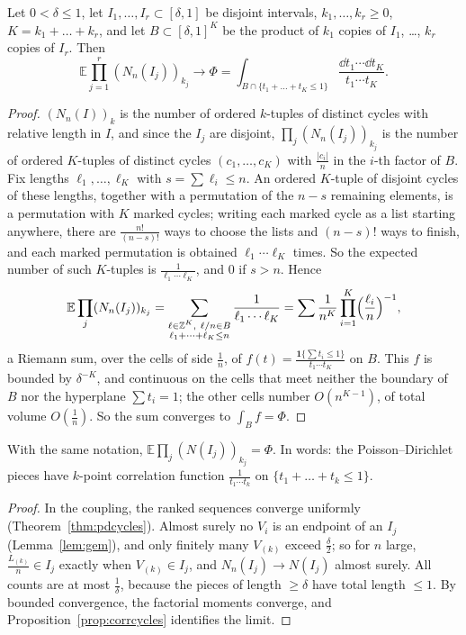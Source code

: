 \begin{proposition}\label{prop:corrcycles}
Let $0<\delta\le1$, let $I_1,\dots,I_r\subset[\delta,1]$ be disjoint intervals, $k_1,\dots,k_r\ge0$, $K=k_1+\dots+k_r$, and let $B\subset[\delta,1]^K$ be the product of $k_1$ copies of $I_1$, \ldots, $k_r$ copies of $I_r$. Then
\[
\mathbb E\prod_{j=1}^r(N_n(I_j))_{k_j}\longrightarrow\Phi=\int_{B\cap\{t_1+\dots+t_K\le1\}}\frac{\dd t_1\cdots\dd t_K}{t_1\cdots t_K}.
\]
\end{proposition}
\begin{proof}
$(N_n(I))_k$ is the number of ordered $k$-tuples of distinct cycles with relative length in $I$, and since the $I_j$ are disjoint, $\prod_j(N_n(I_j))_{k_j}$ is the number of ordered $K$-tuples of distinct cycles $(c_1,\dots,c_K)$ with $\frac{|c_i|}n$ in the
$i$-th factor of $B$. Fix lengths $\ell_1,\dots,\ell_K$ with $s=\sum\ell_i\le n$. An ordered $K$-tuple of disjoint cycles of these lengths, together with a permutation of the $n-s$ remaining elements, is a permutation with $K$ marked cycles; writing each marked cycle as a list starting anywhere,
there are $\frac{n!}{(n-s)!}$ ways to choose the lists and $(n-s)!$ ways to finish, and each marked permutation is obtained $\ell_1\cdots\ell_K$ times. So the expected number of such $K$-tuples is $\frac1{\ell_1\cdots\ell_K}$, and $0$ if $s>n$. Hence
\[
\mathbb E\prod_j(N_n(I_j))_{k_j}=\sum_{\substack{\ell\in\mathbb Z^K,\ \ell/n\in B\\ \ell_1+\dots+\ell_K\le n}}\frac1{\ell_1\cdots\ell_K}=\sum\frac1{n^K}\prod_{i=1}^K\Bigl(\frac{\ell_i}n\Bigr)^{-1},
\]
a Riemann sum, over the cells of side $\frac1n$, of $f(t)=\frac{\mathbf 1\{\sum t_i\le1\}}{t_1\cdots t_K}$ on $B$. This $f$ is bounded by $\delta^{-K}$, and continuous on the cells that meet neither the boundary of $B$ nor the hyperplane $\sum t_i=1$; the other cells number $O(n^{K-1})$, of total volume
$O(\frac1n)$. So the sum converges to $\int_Bf=\Phi$.
\end{proof}

\begin{corollary}\label{cor:pdcorr}
With the same notation, $\mathbb E\prod_j(N(I_j))_{k_j}=\Phi$. In words: the Poisson--Dirichlet pieces have $k$-point correlation function $\frac1{t_1\cdots t_k}$ on $\{t_1+\dots+t_k\le1\}$.
\end{corollary}
\begin{proof}
In the coupling, the ranked sequences converge uniformly (Theorem~\ref{thm:pdcycles}). Almost surely no $V_i$ is an endpoint of an $I_j$ (Lemma~\ref{lem:gem}), and only finitely many $V_{(k)}$ exceed $\frac\delta2$; so for $n$ large, $\frac{L_{(k)}}n\in I_j$ exactly when $V_{(k)}\in I_j$, and
$N_n(I_j)\to N(I_j)$ almost surely. All counts are at most $\frac1\delta$, because the pieces of length $\ge\delta$ have total length $\le1$. By bounded convergence, the factorial moments converge, and Proposition~\ref{prop:corrcycles} identifies the limit.
\end{proof}

